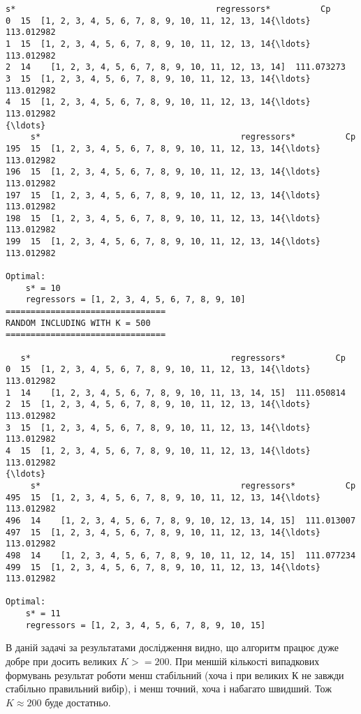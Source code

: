 \documentclass[11pt]{article}
\begin{document}
\begin{Verbatim}[commandchars=\\\{\}]
   s*                                        regressors*          Cp
0  15  [1, 2, 3, 4, 5, 6, 7, 8, 9, 10, 11, 12, 13, 14{\ldots}  113.012982
1  15  [1, 2, 3, 4, 5, 6, 7, 8, 9, 10, 11, 12, 13, 14{\ldots}  113.012982
2  14    [1, 2, 3, 4, 5, 6, 7, 8, 9, 10, 11, 12, 13, 14]  111.073273
3  15  [1, 2, 3, 4, 5, 6, 7, 8, 9, 10, 11, 12, 13, 14{\ldots}  113.012982
4  15  [1, 2, 3, 4, 5, 6, 7, 8, 9, 10, 11, 12, 13, 14{\ldots}  113.012982
{\ldots}
     s*                                        regressors*          Cp
195  15  [1, 2, 3, 4, 5, 6, 7, 8, 9, 10, 11, 12, 13, 14{\ldots}  113.012982
196  15  [1, 2, 3, 4, 5, 6, 7, 8, 9, 10, 11, 12, 13, 14{\ldots}  113.012982
197  15  [1, 2, 3, 4, 5, 6, 7, 8, 9, 10, 11, 12, 13, 14{\ldots}  113.012982
198  15  [1, 2, 3, 4, 5, 6, 7, 8, 9, 10, 11, 12, 13, 14{\ldots}  113.012982
199  15  [1, 2, 3, 4, 5, 6, 7, 8, 9, 10, 11, 12, 13, 14{\ldots}  113.012982

Optimal:
	s* = 10
	regressors = [1, 2, 3, 4, 5, 6, 7, 8, 9, 10]
================================
RANDOM INCLUDING WITH K = 500
================================

   s*                                        regressors*          Cp
0  15  [1, 2, 3, 4, 5, 6, 7, 8, 9, 10, 11, 12, 13, 14{\ldots}  113.012982
1  14    [1, 2, 3, 4, 5, 6, 7, 8, 9, 10, 11, 13, 14, 15]  111.050814
2  15  [1, 2, 3, 4, 5, 6, 7, 8, 9, 10, 11, 12, 13, 14{\ldots}  113.012982
3  15  [1, 2, 3, 4, 5, 6, 7, 8, 9, 10, 11, 12, 13, 14{\ldots}  113.012982
4  15  [1, 2, 3, 4, 5, 6, 7, 8, 9, 10, 11, 12, 13, 14{\ldots}  113.012982
{\ldots}
     s*                                        regressors*          Cp
495  15  [1, 2, 3, 4, 5, 6, 7, 8, 9, 10, 11, 12, 13, 14{\ldots}  113.012982
496  14    [1, 2, 3, 4, 5, 6, 7, 8, 9, 10, 12, 13, 14, 15]  111.013007
497  15  [1, 2, 3, 4, 5, 6, 7, 8, 9, 10, 11, 12, 13, 14{\ldots}  113.012982
498  14    [1, 2, 3, 4, 5, 6, 7, 8, 9, 10, 11, 12, 14, 15]  111.077234
499  15  [1, 2, 3, 4, 5, 6, 7, 8, 9, 10, 11, 12, 13, 14{\ldots}  113.012982

Optimal:
	s* = 11
	regressors = [1, 2, 3, 4, 5, 6, 7, 8, 9, 10, 15]

    \end{Verbatim}

    В даній задачі за результатами дослідження видно, що алгоритм працює
дуже добре при досить великих \(K>=200\). При меншій кількості
випадкових формувань результат роботи менш стабільний (хоча і при
великих К не завжди стабільно правильний вибір), і менш точний, хоча і
набагато швидший. Тож \(K\approx200\) буде достатньо.
\end{document}
